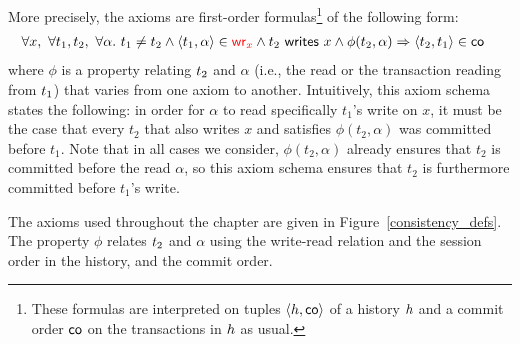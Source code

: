 More precisely, the axioms are first-order formulas\footnote{These formulas are interpreted on tuples $\tup{\hist,\co}$ of a history $\hist$ and a commit order $\co$ on the transactions in $\hist$ as usual.} of the following form:
\begin{align}
  & \forall \xvar,\ \forall \tr_1,\tr_2,\ \forall \alpha.\ \tr_1\neq \tr_2\land \tup{\tr_1,\alpha}\in \wro[\xvar] \land \writeVar{\tr_2}{\xvar} \land \phi(\tr_2,\alpha) \implies \tup{\tr_2,\tr_1}\in\co \label{eq:axiom:cons}
\end{align}
where $\phi$ is a property relating $\tr_2$ and $\alpha$ (i.e., the read or the transaction reading from $\tr_1$) that varies from one axiom to another. Intuitively, this axiom schema states the following: in order for $\alpha$ to read specifically $t_1$'s write on $x$, it must be the case that every $t_2$ that also writes $x$ and satisfies $\phi(t_2,\alpha)$ was committed before $t_1$. Note that in all cases we consider, $\phi(t_2,\alpha)$ already ensures that $t_2$ is committed before the read $\alpha$, so this axiom schema ensures that $t_2$ is furthermore committed before $t_1$'s write.

The axioms used throughout the chapter are given in Figure~\ref{consistency_defs}. The property $\phi$ relates $\tr_2$ and $\alpha$ using the write-read relation and the session order in the history, and the commit order. 

